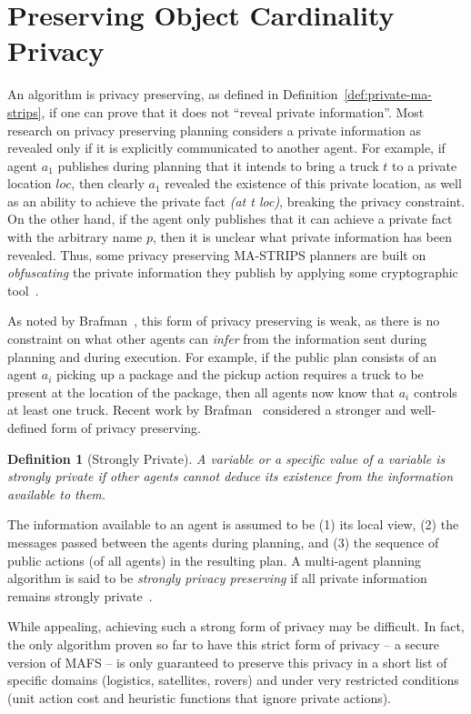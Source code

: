 \documentclass[letterpaper]{article}
\newtheorem{definition}{Definition}
\theoremstyle{definition}
\begin{document}
\section{Preserving Object Cardinality Privacy }
\label{sec:preserving}

An algorithm is privacy preserving, as defined in Definition~\ref{def:private-ma-strips}, if one can prove that it does not ``reveal private information''. Most research on privacy preserving planning considers a private information as revealed only if it is explicitly communicated to another agent. For example, if agent $a_1$ publishes during planning that it intends to bring a truck $t$ to a private location $loc$, then clearly $a_1$ revealed the existence of this private location, as well as an ability to achieve the private fact {\em (at t loc)}, breaking  the privacy constraint. On the other hand, if the agent only publishes that it can achieve a private fact with the arbitrary name $p$, then it is unclear what private information has been revealed. Thus, some privacy preserving MA-STRIPS planners are built on {\em obfuscating} the private information they publish by applying some cryptographic tool~\cite{luis2014planMerging,Luis2015PMR,Borrajo2015MAPR_CMAP}. 

As noted by Brafman~, this form of privacy preserving is weak, as there is no constraint on what other agents can {\em infer} from the information sent during planning and during execution. For example, if the public plan consists of an agent $a_i$ picking up a package and the pickup action requires a truck to be present at the location of the package, then all agents now know that $a_i$ controls at least one truck. Recent work by Brafman~ considered a stronger and well-defined form of privacy preserving. 
\begin{definition}[Strongly Private]
A variable or a specific value of a variable is {\em strongly private} if  other agents cannot deduce its existence from the information available to them.
\label{def:strong-private}
\end{definition}
The information available to an agent is assumed to be (1) its local view, (2) the messages passed between the agents during planning, and (3) the sequence of public actions (of all agents) in the resulting plan. A multi-agent planning algorithm is said to be {\em strongly privacy preserving} if all private information remains strongly private~\cite{Brafman15}. 

While appealing, achieving such a strong form of privacy may be difficult. In fact, the only algorithm proven so far to have this strict form of privacy -- a secure version of MAFS -- is only guaranteed to preserve this privacy in a short list of specific domains (logistics, satellites, rovers) and under very restricted conditions (unit action cost and heuristic functions that ignore private actions).  
\end{document}
